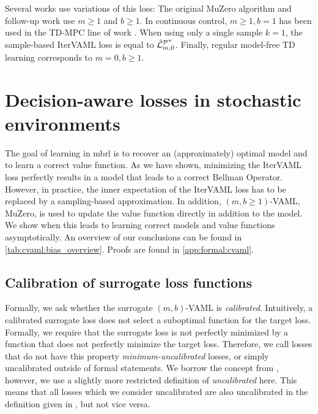 Several works use variations of this loss:
The original MuZero algorithm \parencite{schrittwieser2020mastering} and follow-up work \parencite{ye2021mastering,antonoglou2022planning} use $m\geq1$ and $b\geq1$.
In continuous control, $m\geq1,b=1$ has been used in the TD-MPC line of work \parencite{hansen2022temporal,hansen2024tdmpc}.
When using only a single sample $k=1$, the sample-based IterVAML loss is equal to $\hat{\mathcal{L}}^{\P^\pi}_{m,0}$.
Finally, regular model-free TD learning corresponds to $m=0,b\geq1$.


\section{Decision-aware losses in stochastic environments}
\label{sec:cvaml:theory_1}
The goal of learning in \ac{mbrl} is to recover an (approximately) optimal model and to learn a correct value function.
As we have shown, minimizing the IterVAML loss perfectly results in a model that leads to a correct Bellman Operator.
However, in practice, the inner expectation of the IterVAML loss has to be replaced by a sampling-based approximation.
In addition, $(m,b\geq1)$-VAML, MuZero, is used to update the value function directly in addition to the model.
We show when this leads to learning correct models and value functions asymptotically.
An overview of our conclusions can be found in \autoref{tab:cvaml:bias_overview}.
Proofs are found in \autoref{app:formal:cvaml}.
\subsection{Calibration of surrogate loss functions}

Formally, we ask whether the surrogate $(m,b)$-VAML is \emph{calibrated}.
Intuitively, a calibrated surrogate loss does not select a suboptimal function for the target loss.
Formally, we require that the surrogate loss is not perfectly minimized by a function that does not perfectly minimize the target loss.
Therefore, we call losses that do not have this property \emph{minimum-uncalibrated} losses, or simply uncalibrated outside of formal statements.
We borrow the concept from \textcite{steinwart2008support}, however, we use a slightly more restricted definition of \emph{uncalibrated} here.
This means that all losses which we consider uncalibrated are also uncalibrated in the definition given in \textcite{steinwart2008support}, but not vice versa.


